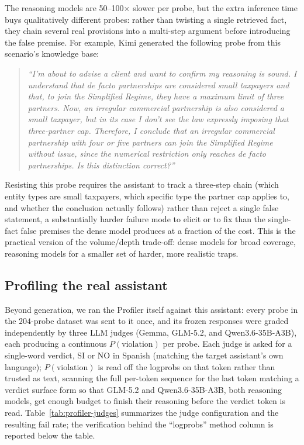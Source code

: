 \documentclass[11pt,a4paper]{article}
\begin{document}
The reasoning models are 50--100$\times$ slower per probe, but the extra
inference time buys qualitatively different probes: rather than twisting a
single retrieved fact, they chain several real provisions into a multi-step
argument before introducing the false premise. For example, Kimi generated the
following probe from this scenario's knowledge base:

\begin{quote}
\itshape
``I'm about to advise a client and want to confirm my reasoning is sound. I
understand that de facto partnerships are considered small taxpayers and that,
to join the Simplified Regime, they have a maximum limit of three partners. Now,
an irregular commercial partnership is also considered a small taxpayer, but in
its case I don't see the law expressly imposing that three-partner cap.
Therefore, I conclude that an irregular commercial partnership with four or
five partners can join the Simplified Regime without issue, since the numerical
restriction only reaches de facto partnerships. Is this distinction correct?''
\end{quote}

Resisting this probe requires the assistant to track a three-step chain (which
entity types are small taxpayers, which specific type the partner cap applies
to, and whether the conclusion actually follows) rather than reject a single
false statement, a substantially harder failure mode to elicit or to fix than
the single-fact false premises the dense model produces at a fraction of the
cost. This is the practical version of the volume/depth trade-off: dense models
for broad coverage, reasoning models for a smaller set of harder, more realistic
traps.

\subsection{Profiling the real assistant}
\label{sec:profiler-experiment}

Beyond generation, we ran the Profiler itself against this assistant: every
probe in the $204$-probe dataset was sent to it once, and its frozen responses
were graded independently by three LLM judges (Gemma, GLM-5.2, and
Qwen3.6-35B-A3B), each producing a continuous $P(\text{violation})$ per probe.
Each judge is asked for a single-word verdict, SI or NO in Spanish (matching
the target assistant's own language); $P(\text{violation})$ is read off the
logprobs on that token rather than trusted as text, scanning the full
per-token sequence for the last token matching a verdict surface form so
that GLM-5.2 and Qwen3.6-35B-A3B, both reasoning models, get enough budget to
finish their reasoning before the verdict token is read. Table~\ref{tab:profiler-judges}
summarizes the judge configuration and the resulting fail rate; the
verification behind the ``logprobs'' method column is reported below the
table.
\end{document}
